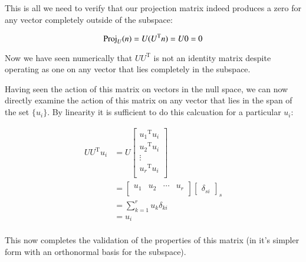 \documentclass{article}      %
\newcommand{\transpose}[1]{{{#1}^{\text{T}}}}
\begin{document}
This is all we need to verify that our projection matrix indeed produces a zero for any vector completely outside of the subspace:

\[
\Proj_U(n) = U (\transpose{U} n) = U 0 = 0
\]

Now we have seen numerically that $U \transpose{U}$ is not an identity matrix despite 
operating as one on any vector that lies completely in the subspace.

Having seen the action of this matrix on vectors in the null space, we can now
directly examine the action of this matrix on any vector that lies in the
span of the set $\{u_i\}$.  By linearity it is sufficient to do this calcuation 
for a particular $u_i$:

\begin{align*}
U \transpose{U} u_i
&=
U
\begin{bmatrix}
\transpose{u_1} u_i \\
\transpose{u_2} u_i \\
\vdots \\
\transpose{u_r} u_i \\
\end{bmatrix}
\\
&=
\begin{bmatrix}
{u_1} & {u_2} & \cdots & {u_r} \\
\end{bmatrix}
{
\begin{bmatrix}
\delta_{si}
\end{bmatrix}
}_s \\
&= \sum_{k=1}^{r} u_k \delta_{ki} \\
&= u_i \\
\end{align*}

This now completes the validation of the properties of this matrix (in it's simpler form with an orthonormal basis for the subspace).




%
%
%
\end{document}
